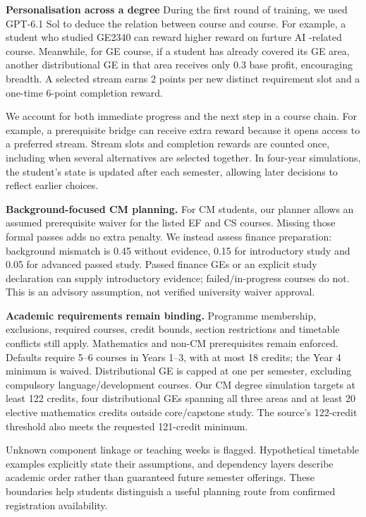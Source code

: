 \documentclass{article}
\begin{document}
\textbf{Personalisation across a degree} During the first round of training, we used GPT-6.1 Sol to deduce the relation between course and course. For example, a student who studied GE2340 can reward higher reward on furture AI -related course. Meanwhile, for GE course, if a student has already
covered its GE area, another distributional GE in that area receives only 0.3 base profit, encouraging breadth. A selected stream earns 2 points per new distinct requirement slot and a one-time 6-point completion reward. 

We account for both immediate progress and the next step in a course chain. For example, a prerequisite bridge can receive extra reward because it opens access to a preferred stream. Stream slots and completion rewards are counted once, including when several alternatives are selected together. In four-year simulations, the student's state is updated after each semester, allowing later decisions to reflect earlier choices.


\textbf{Background-focused CM planning.} For CM students, our planner allows an assumed prerequisite waiver for the listed EF and CS courses. Missing those formal passes adds no extra penalty. We instead assess finance preparation: background mismatch is 0.45 without evidence, 0.15 for introductory study and 0.05 for advanced passed study. Passed finance GEs or an explicit study declaration can supply introductory evidence; failed/in-progress courses do not. This is an advisory assumption, not verified university waiver approval.

\textbf{Academic requirements remain binding.} Programme membership, exclusions, required courses, credit bounds, section restrictions and timetable conflicts still apply. Mathematics and non-CM prerequisites remain enforced. Defaults require 5--6 courses in Years 1--3, with at most 18 credits; the Year 4 minimum is waived. Distributional GE is capped at one per semester, excluding compulsory language/development courses. Our CM degree simulation targets at least 122 credits, four distributional GEs spanning all three areas and at least 20 elective mathematics credits outside core/capstone study. The source's 122-credit threshold also meets the requested 121-credit minimum.

Unknown component linkage or teaching weeks is flagged. Hypothetical timetable examples explicitly state their assumptions, and dependency layers describe academic order rather than guaranteed future semester offerings. These boundaries help students distinguish a useful planning route from confirmed registration availability.
\end{document}
